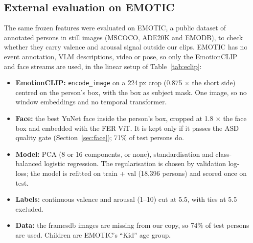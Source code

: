 \documentclass[11pt]{article}
\newcommand{\code}[1]{\texttt{#1}}
\begin{document}
\subsection{External evaluation on EMOTIC}\label{sec:emotic}
The same frozen features were evaluated on EMOTIC, a public dataset of annotated persons in still images (MSCOCO, ADE20K and EMODB), to check whether they carry valence and arousal signal outside our clips. EMOTIC has no event annotation, VLM descriptions, video or pose, so only the EmotionCLIP and face streams are used, in the linear setup of Table~\ref{tab:eclip}:
\begin{itemize}
  \item \textbf{EmotionCLIP:} \code{encode\_image} on a 224\,px crop (0.875 $\times$ the short side) centred on the person's box, with the box as subject mask. One image, so no window embeddings and no temporal transformer.
  \item \textbf{Face:} the best YuNet face inside the person's box, cropped at 1.8 $\times$ the face box and embedded with the FER ViT. It is kept only if it passes the ASD quality gate (Section~\ref{sec:face}); 71\% of test persons do.
  \item \textbf{Model:} PCA (8 or 16 components, or none), standardisation and class-balanced logistic regression. The regularisation is chosen by validation log-loss; the model is refitted on train + val (18,396 persons) and scored once on test.
  \item \textbf{Labels:} continuous valence and arousal (1--10) cut at 5.5, with ties at 5.5 excluded.
  \item \textbf{Data:} the framesdb images are missing from our copy, so 74\% of test persons are used. Children are EMOTIC's ``Kid'' age group.
\end{itemize}
\end{document}
